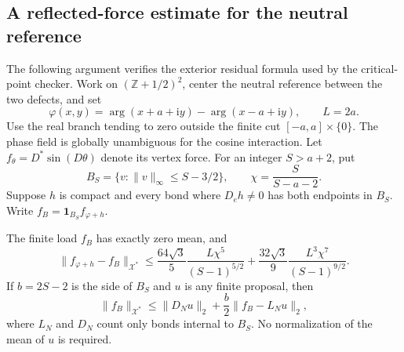 \subsection{A reflected-force estimate for the neutral reference}

The following argument verifies the exterior residual formula used by the
critical-point checker. Work on $(\mathbb Z+1/2)^2$, center the neutral
reference between the two defects, and set
\[
 \varphi(x,y)=\arg(x+a+\mathrm i y)-\arg(x-a+\mathrm i y),\qquad L=2a.
\]
Use the real branch tending to zero outside the finite cut
$[-a,a]\times\{0\}$. The phase field is globally unambiguous for the cosine
interaction. Let $f_\theta=D^*\sin(D\theta)$ denote its vertex force.
For an integer $S>a+2$, put
\[
 B_S=\{v:\|v\|_\infty\le S-3/2\},\qquad
 \chi=\frac{S}{S-a-2}.
\]
Suppose $h$ is compact and every bond where $D_eh\ne0$ has both endpoints
in $B_S$. Write $f_B=\mathbf1_{B_S}f_{\varphi+h}$.

\begin{lemma}
The finite load $f_B$ has exactly zero mean, and
\[
 \|f_{\varphi+h}-f_B\|_{\mathcal X^*}
 \le \frac{64\sqrt3}{5}\frac{L\chi^5}{(S-1)^{5/2}}
      +\frac{32\sqrt3}{9}\frac{L^3\chi^7}{(S-1)^{9/2}}.
\]
If $b=2S-2$ is the side of $B_S$ and $u$ is any finite proposal, then
\[
 \|f_B\|_{\mathcal X^*}
 \le\|D_Nu\|_2+\frac b2\|f_B-L_Nu\|_2,
\]
where $L_N$ and $D_N$ count only bonds internal to $B_S$. No normalization
of the mean of $u$ is required.
\end{lemma}

